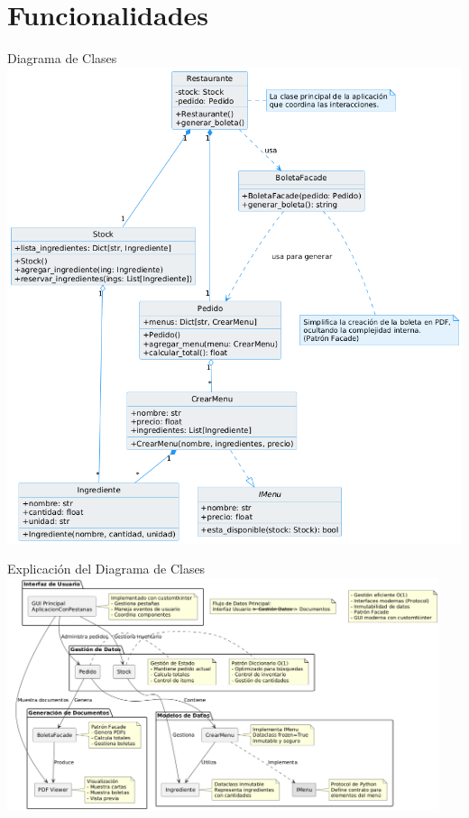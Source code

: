 \documentclass[12pt]{beamer}
\begin{document}
\section{Funcionalidades}
\begin{frame}{Diagrama de Clases}
    \centering
    \includegraphics[height=0.8\textheight]{images/diagrama.png}
\end{frame}

\begin{frame}{Explicación del Diagrama de Clases}
    \centering
    \includegraphics[width=0.95\textwidth,height=0.8\textheight,keepaspectratio]{images/explicacion_diagrama.png}
\end{frame}
\end{document}
